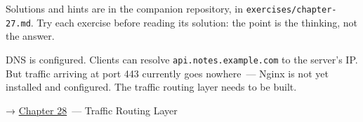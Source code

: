\noindent{}Solutions and hints are in the companion repository, in \texttt{exercises/}\allowbreak{}\texttt{chapter-27.md}. Try each exercise before reading its solution: the point is the thinking, not the answer.

\label{27-domain-and-dns:whats-next}

DNS is configured. Clients can resolve \texttt{api.notes.example.com} to the server's IP. But traffic arriving at port 443 currently goes nowhere~--- Nginx is not yet installed and configured. The traffic routing layer needs to be built.

\noindent{}→ \hyperref[ch:28-traffic-routing]{Chapter 28}~--- Traffic Routing Layer
